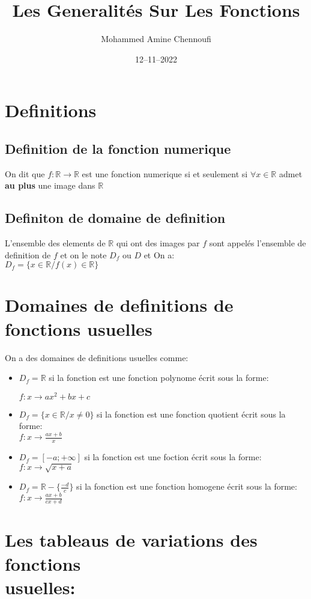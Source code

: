 \documentclass[12pt]{extarticle}
\title{Les Generalités Sur Les Fonctions}
\date{12--11--2022}
\author{Mohammed Amine Chennoufi}
\begin{document}
\maketitle
\tableofcontents
\newpage

\section{Definitions }
\subsection{Definition de la fonction numerique}
On dit que $f: \mathbb{R} \rightarrow \mathbb{R}$ est une fonction numerique si et seulement si 
$\forall x \in \mathbb{R}$ admet \textbf{au plus} une image dans $\mathbb{R}$

\subsection{Definiton de domaine de definition}
L'ensemble des elements de $\mathbb{R}$ qui ont des images par $f$ sont appelés
l'ensemble de definition de $f$ et on le note $D_f$ ou $D$
et On a:\\
$D_f = \{x \in \mathbb{R}/f(x) \in \mathbb{R}\}$
\section{Domaines de definitions de fonctions usuelles}
On a des domaines de definitions usuelles comme: 
\begin{itemize}
	\item $D_f = \mathbb{R}$ si la fonction est une fonction polynome écrit sous la forme:

$f:x \rightarrow ax^2 + bx + c $
\item $D_f = \{x \in \mathbb{R}/ x \neq 0\}$ si la fonction est une fonction quotient écrit sous la forme: \\
	$f:x \rightarrow \frac{ax+b}{x} $
\item $D_f = [-a;+\infty]$ si la fonction est une foction écrit sous la forme: \\
	$f:x  \rightarrow \sqrt{x + a} $
\item $D_f = \mathbb{R} - \{ \frac{-d}{c}\} $ si la fonction est une fonction homogene écrit sous la forme:\\
	$f:x \rightarrow \displaystyle\frac{ax + b}{cx + d} $

\end{itemize}
\newpage
\section{Les tableaus de variations des fonctions \\usuelles:}
\end{document}
